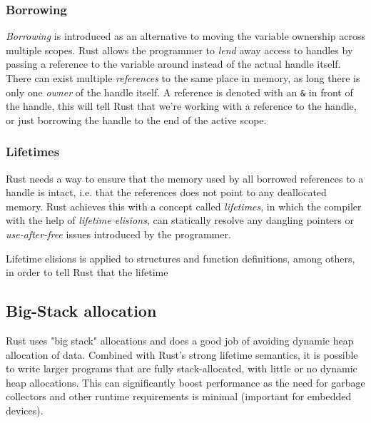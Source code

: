 \subsubsection{Borrowing} \hfill

\emph{Borrowing} is introduced as an alternative to moving the variable ownership across multiple
scopes. Rust allows the programmer to \emph{lend} away access to handles by passing a reference to
the variable around instead of the actual handle itself. There can exist multiple \emph{references}
to the same place in memory, as long there is only one \emph{owner} of the handle itself. A
reference is denoted with an \texttt{\&} in front of the handle, this will tell Rust that we're
working with a reference to the handle, or just borrowing the handle to the end of the active scope.


\subsubsection{Lifetimes} \hfill

Rust needs a way to ensure that the memory used by all borrowed references to a handle is intact,
i.e. that the references does not point to any deallocated memory. Rust achieves this with a concept
called \emph{lifetimes}, in which  the compiler with the help of \emph{lifetime elisions}, can
statically resolve any dangling pointers or \emph{use-after-free} issues introduced by the
programmer.

Lifetime elisions is applied to structures and function definitions, among others, in order to tell
Rust that the lifetime



\subsection{Big-Stack allocation}
\label{par:big_stack}

Rust uses "big stack" allocations 
and does a good job of avoiding dynamic heap allocation of data. Combined with Rust's strong
lifetime semantics, it is possible to write larger programs that are fully stack-allocated, with
little or no dynamic heap allocations. This can significantly boost performance as the need for
garbage collectors and other runtime requirements is minimal (important for embedded devices).


